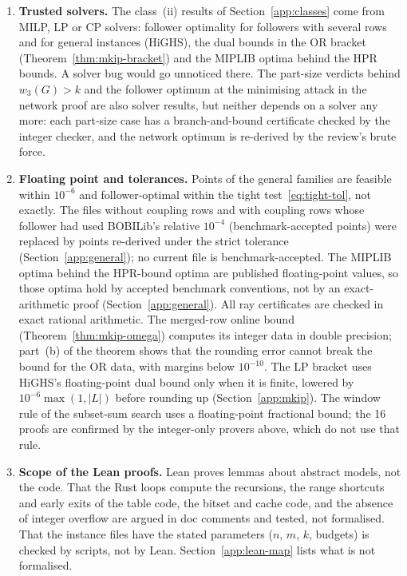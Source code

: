 \begin{enumerate}
\item \textbf{Trusted solvers.} The class~(ii) results of
Section~\ref{app:classes} come from MILP, LP or CP solvers: follower
optimality for followers with several rows and for general instances
(HiGHS), the dual bounds in the OR bracket (Theorem~\ref{thm:mkip-bracket})
and the MIPLIB optima behind the HPR bounds. A solver bug would go unnoticed
there. The \NumCliquePartCases{} part-size verdicts behind $w_3(G)>k$ and the
follower optimum at the minimising attack in the network proof are also solver
results, but neither depends on a solver any more: each part-size case has a
branch-and-bound certificate checked by the integer checker, and the network
optimum is re-derived by the review's brute force.

\item \textbf{Floating point and tolerances.} Points of the general
families are feasible within $10^{-6}$ and follower-optimal within the tight
test~\eqref{eq:tight-tol}, not exactly. The \NumTightSupersededGeneral{} files
without coupling rows and \NumTightSupersededCoupledBench{} with coupling rows
whose follower had used BOBILib's relative $10^{-4}$ (benchmark-accepted
points) were replaced by points re-derived under the strict tolerance
(Section~\ref{app:general}); no current file is benchmark-accepted. The MIPLIB
optima behind the \NumHprOptimal{} HPR-bound optima are published floating-point
values, so those optima hold by accepted benchmark conventions, not by an
exact-arithmetic proof (Section~\ref{app:general}). All \NumNoFeasible{} ray
certificates are checked in exact rational arithmetic. The merged-row online
bound (Theorem~\ref{thm:mkip-omega}) computes its integer data in double
precision; part~(b) of the theorem shows that the rounding error cannot break
the bound for the OR data, with margins below $10^{-10}$. The LP bracket uses
HiGHS's floating-point dual bound only when it is finite, lowered by
$10^{-6}\max(1,|L|)$ before rounding up (Section~\ref{app:mkip}). The window
rule of the subset-sum search uses a floating-point fractional bound; the 16
proofs are confirmed by the integer-only provers above, which do not use
that rule.

\item \textbf{Scope of the Lean proofs.} Lean proves lemmas about abstract
models, not the code. That the Rust loops compute the recursions, the range
shortcuts and early exits of the table code, the bitset and cache code, and
the absence of integer overflow are argued in doc comments and tested, not
formalised. That the instance files have the stated parameters ($n$, $m$, $k$,
budgets) is checked by scripts, not by Lean. Section~\ref{app:lean-map} lists
what is not formalised.


\end{enumerate}
